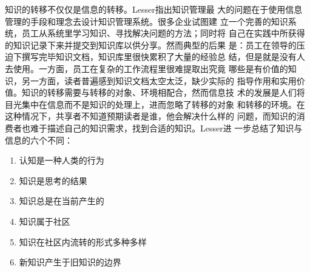 \documentclass[12pt,a4paper]{Ctexart}
\begin{document}
知识的转移不仅仅是信息的转移。Lesser\cite{lesser2000kac}指出知识管理最
大的问题在于使用信息管理的手段和理念去设计知识管理系统。很多企业试图建
立一个完善的知识系统，员工从系统里学习知识、寻找解决问题的方法；同时将
自己在实践中所获得的知识记录下来并提交到知识库以供分享。然而典型的后果
是：员工在领导的压迫下撰写完毕知识文档，知识库里很快累积了大量的经验总
结，但是就是没有人去使用。一方面，员工在复杂的工作流程里很难提取出究竟
哪些是有价值的知识，另一方面，读者普遍感到知识文档太空太泛，缺少实际的
指导作用和实用价值。知识的转移需要与转移的对象、环境相配合，然而信息技
术的发展是人们将目光集中在信息而不是知识的处理上，进而忽略了转移的对象
和转移的环境。在这种情况下，共享者不知道预期读者是谁，他会解决什么样的
问题，而知识的消费者也难于描述自己的知识需求，找到合适的知识。Lesser进
一步总结了知识与信息的六个不同：
\begin{enumerate}
\item 认知是一种人类的行为
\item 知识是思考的结果
\item 知识总是在当前产生的
\item 知识属于社区
\item 知识在社区内流转的形式多种多样
\item 新知识产生于旧知识的边界
\end{enumerate}











\end{document}
